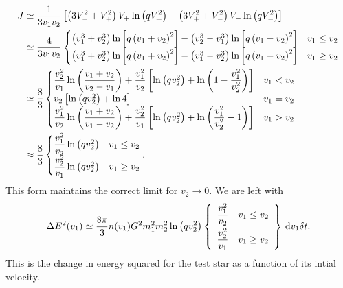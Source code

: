 \begin{align}
J \simeq {} & \frac{1}{3 v_1 v_2} \left[\left(3V_-^2 + V_+^2\right)V_+\ln\left(qV_+^2\right) - \left(3V_+^2 + V_-^2\right)V_-\ln\left(qV_-^2\right)\right] \\
 \simeq {} & \frac{4}{3v_1v_2}\begin{cases}
\left(v_1^3 + v_2^3\right)\ln\left[q\left(v_1 + v_2\right)^2\right] - \left(v_2^3 - v_1^3\right)\ln\left[q\left(v_1 - v_2\right)^2\right] & v_1 \leq v_2 \\
\left(v_1^3 + v_2^3\right)\ln\left[q\left(v_1 + v_2\right)^2\right] - \left(v_1^3 - v_2^3\right)\ln\left[q\left(v_1 - v_2\right)^2\right] & v_1 \geq v_2
\end{cases} \\
 \simeq {} & \frac{8}{3}\begin{cases}
\dfrac{v_2^2}{v_1}\ln\left(\dfrac{v_1 + v_2}{v_2 - v_1}\right) + \dfrac{v_1^2}{v_2}\left[\ln\left(qv_2^2\right) + \ln\left(1 - \dfrac{v_1^2}{v_2^2}\right)\right] & v_1 < v_2 \\
v_2\left[\ln\left(qv_2^2\right) + \ln 4\right] & v_1 = v_2\\
\dfrac{v_1^2}{v_2}\ln\left(\dfrac{v_1 + v_2}{v_1 - v_2}\right) + \dfrac{v_2^2}{v_1}\left[\ln\left(qv_2^2\right) + \ln\left(\dfrac{v_1^2}{v_2^2} - 1\right)\right] & v_1 > v_2
\end{cases} \\
\approx {} & \frac{8}{3}\begin{cases}
\dfrac{v_1^2}{v_2}\ln\left(qv_2^2\right) & v_1 \leq v_2 \\
\dfrac{v_2^2}{v_1}\ln\left(qv_2^2\right) & v_1 \geq v_2
\end{cases}.
\end{align}
This form maintains the correct limit for $v_2 \rightarrow 0$. We are left with
\begin{equation}
\Delta E^2(v_1) \simeq \frac{8\pi}{3} n(v_1)G^2m_1^2 m_2^2\ln\left(qv_2^2\right)\left\{\begin{array}{lr}\dfrac{v_1^2}{v_2}\vspace{1.0mm} & v_1 \leq v_2\\ \dfrac{v_2^2}{v_1} & v_1 \geq v_2 \end{array}\right\}\,\dd v_1\delta t.
\end{equation}
This is the change in energy squared for the test star as a function of its intial velocity.
